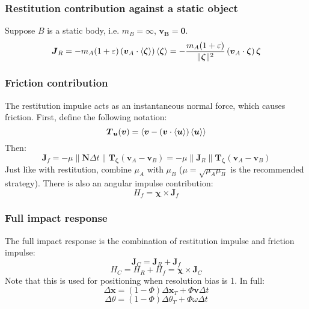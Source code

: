 \documentclass[10pt]{report}
\begin{document}
\subsubsection{Restitution contribution against a static object}
Suppose $B$ is a static body, i.e. $m_B=\infty$, $\boldsymbol{v_B}=\boldsymbol{0}$.
\begin{equation}\boldsymbol{J}_R=-m_A(1+\varepsilon)\left(\boldsymbol{v}_A\cdot\braket{\boldsymbol{\zeta}}\right)\braket{\boldsymbol{\zeta}}=-\frac{m_A(1+\varepsilon)}{\|\boldsymbol{\zeta}\|^2}\left(\boldsymbol{v}_A\cdot\boldsymbol{\zeta}\right)\boldsymbol{\zeta}\end{equation}

\subsubsection{Friction contribution}
The restitution impulse acts as an instantaneous normal force, which causes friction. First, define the following notation:
\begin{equation}\boldsymbol{T}_{\boldsymbol{u}}(\boldsymbol{v})=\braket{\boldsymbol{v}-(\boldsymbol{v}\cdot\braket{\boldsymbol{u}})\braket{\boldsymbol{u}}}\end{equation}
Then:
\begin{equation}\boldsymbol{J}_f=-\mu\|\boldsymbol{N}\Delta t\|\boldsymbol{T}_{\boldsymbol{\zeta}}(\boldsymbol{v}_A-\boldsymbol{v}_B)=-\mu\left\|\boldsymbol{J}_R\right\|\boldsymbol{T}_{\boldsymbol{\zeta}}(\boldsymbol{v}_A-\boldsymbol{v}_B)\end{equation}
Just like with restitution, combine $\mu_A$ with $\mu_B$ ($\mu=\sqrt{\mu_A\mu_B}$ is the recommended strategy). There is also an angular impulse contribution:
\begin{equation}H_f=\boldsymbol{\chi}\times\boldsymbol{J}_f\end{equation}

\subsubsection{Full impact response}
The full impact response is the combination of restitution impulse and friction impulse:
\begin{equation}\boldsymbol{J}_C=\boldsymbol{J}_R+\boldsymbol{J}_f\end{equation}
\begin{equation}H_C=H_R+H_f=\boldsymbol{\chi}\times\boldsymbol{J}_C\end{equation}
Note that this is used for positioning when resolution bias is 1. In full:
\begin{equation}\Delta\boldsymbol{x}=(1-\Phi)\Delta\boldsymbol{x}_T+\Phi\boldsymbol{v}\Delta t\end{equation}
\begin{equation}\Delta\theta=(1-\Phi)\Delta\theta_T+\Phi\omega\Delta t\end{equation}
\end{document}
